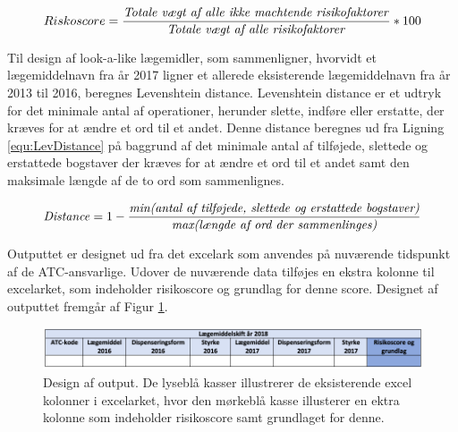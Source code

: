 \begin{equation}  \label{equ:risikoscore}
Riskoscore = \frac{\mbox{\textit{Totale vægt af alle ikke machtende risikofaktorer}}}{\mbox{\textit{Totale vægt af alle risikofaktorer}}} * 100
\end{equation}

Til design af look-a-like lægemidler, som sammenligner, hvorvidt et lægemiddelnavn fra år 2017 ligner et allerede eksisterende lægemiddelnavn fra år 2013 til 2016, beregnes Levenshtein distance. Levenshtein distance er et udtryk for det minimale antal af operationer, herunder slette, indføre eller erstatte, der kræves for at ændre et ord til et andet. Denne distance beregnes ud fra Ligning \ref{equ:LevDistance} på baggrund af det minimale antal af tilføjede, slettede og erstattede bogstaver der kræves for at ændre et ord til et andet samt den maksimale længde af de to ord som sammenlignes. 

\begin{equation} \label{equ:LevDistance}
\mbox{\textit{Distance}} = 1 - \frac{\mbox{\textit{min(antal af tilføjede, slettede og erstattede bogstaver)}}}{\mbox{\textit{max(længde af ord der sammenlinges)}}}   
\end{equation}

Outputtet er designet ud fra det excelark som anvendes på nuværende tidspunkt af de ATC-ansvarlige. Udover de nuværende data tilføjes en ekstra kolonne til excelarket, som indeholder risikoscore og grundlag for denne score. Designet af outputtet fremgår af Figur \ref{fig:Output}.

\begin{figure}[H]\centering
\includegraphics[width=1\textwidth]{billeder/Output.png} 
	\caption{Design af output. De lyseblå kasser illustrerer de eksisterende excel kolonner i excelarket, hvor den mørkeblå kasse illusterer en ektra kolonne som indeholder risikoscore samt grundlaget for denne.}
	\label{fig:Output}  
\end{figure}


